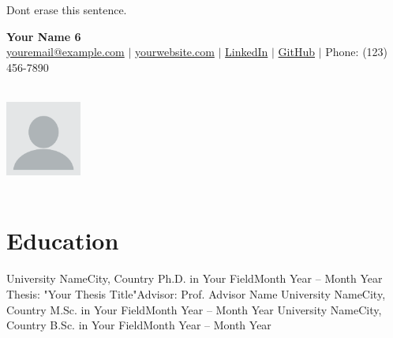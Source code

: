 \label{ResumeSix} %
\thesisspacing %


{\color{white}Dont erase this sentence.}
\medskip



\begin{minipage}{0.7\textwidth}
    \textbf{\Huge Your Name 6} \\[5pt]
    \small \href{mailto:youremail@example.com}{youremail@example.com} $|$ 
    \href{https://yourwebsite.com}{yourwebsite.com} $|$ 
    \href{https://linkedin.com/in/yourprofile}{LinkedIn} $|$ 
    \href{https://github.com/yourprofile}{GitHub} $|$ 
    Phone: (123) 456-7890
\end{minipage}
\begin{minipage}{0.3\textwidth}
    \begin{flushright}
        \includegraphics[width=2.5cm, height=3.5cm]{imgs/your_photo.png} %
    \end{flushright}
\end{minipage}

\section*{Education}
\begin{itemize}[leftmargin=*]
    \resumeEntry
        {University Name}{City, Country}
        {Ph.D. in Your Field}{Month Year – Month Year}
    \resumeSubentry
        {Thesis: "Your Thesis Title"}{Advisor: Prof. Advisor Name}
    \resumeEntry
        {University Name}{City, Country}
        {M.Sc. in Your Field}{Month Year – Month Year}
    \resumeEntry
        {University Name}{City, Country}
        {B.Sc. in Your Field}{Month Year – Month Year}
\end{itemize}

